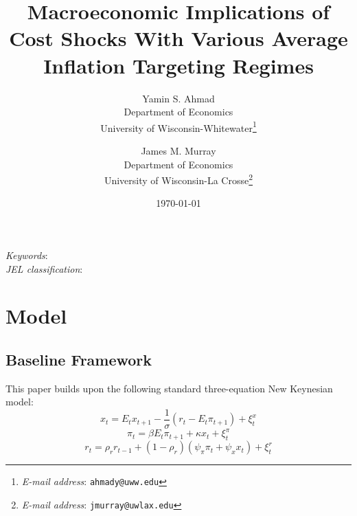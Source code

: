 \documentclass[12pt]{article}
\begin{document}
\begin{titlepage}
\begin{singlespace}
\title{Macroeconomic Implications of Cost Shocks With Various Average Inflation Targeting Regimes}
\date{\today}
\author{
  Yamin S. Ahmad\\
  Department of Economics\\
  University of Wisconsin-Whitewater\footnote{\textit{E-mail address}: \texttt{ahmady@uww.edu}}
  \and
  James M. Murray\\
  Department of Economics\\
  University of Wisconsin-La Crosse\footnote{\textit{E-mail address}: \texttt{jmurray@uwlax.edu}}
}

\maketitle

\thispagestyle{empty}

\newline

\noindent \textit{Keywords}: \\
\noindent \textit{JEL classification}:
\end{singlespace}
\end{titlepage}

\newpage

\section{Model}

\subsection{Baseline Framework}

This paper builds upon the following standard three-equation New Keynesian model:
\begin{equation}\label{eq:IS}
  x_t = E_t x_{t+1} - \frac{1}{\sigma} \left( r_t - E_t \pi_{t+1} \right) + \xi_t^{x}
\end{equation}
\begin{equation}\label{eq:PhillipsCurve}
  \pi_t = \beta E_t \pi_{t+1} + \kappa x_t + \xi_t^{\pi}
\end{equation}
\begin{equation}\label{eq:TaylorRule}
  r_t = \rho_r r_{t-1} + (1-\rho_r) \left( \psi_\pi \pi_t + \psi_x x_t \right) + \xi_t^{r}
\end{equation}
\end{document}
